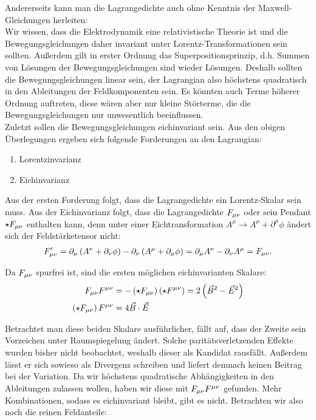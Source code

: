 Andererseits kann man die Lagrangedichte auch ohne Kenntnis der Maxwell-Gleichungen herleiten: \\
Wir wissen, dass die Elektrodynamik eine relativistische Theorie ist und die Bewegungsgleichungen daher invariant unter Lorentz-Transformationen sein sollten. Außerdem gilt in erster Ordnung das Superpositionsprinzip, d.h. Summen von Lösungen der Bewegungsgleichungen sind wieder Lösungen. Deshalb sollten die Bewegungsgleichungen linear sein, der Lagrangian also höchstens quadratisch in den Ableitungen der Feldkomponenten sein. Es könnten auch Terme höherer Ordnung auftreten, diese wären aber nur kleine Störterme, die die Bewegungsgleichungen nur unwesentlich beeinflussen. \\ 
Zuletzt sollen die Bewegungsgleichungen eichinvariant sein.
Aus den obigen Überlegungen ergeben sich folgende Forderungen an den Lagrangian: 
\begin{enumerate}
	\item Lorentzinvarianz
	\item Eichinvarianz 
\end{enumerate}

Aus der ersten Forderung folgt, dass die Lagrangedichte ein Lorentz-Skalar sein muss. Aus der Eichinvarianz folgt, dass die Lagrangedichte $F_{\mu \nu}$ oder sein Pendant $\star F_{\mu \nu}$ enthalten kann, denn unter einer Eichtransformation $A^{\mu} \rightarrow A^{\mu} + \partial^{\mu} \phi$ ändert sich der Feldstärketensor nicht:
\begin{align}
F_{\mu \nu} ' = \partial_{\mu} \left( A^{\nu} + \partial_{\nu} \phi \right) - \partial_{\nu} \left( A^{\mu} + \partial_{\mu} \phi \right) = \partial_{\mu}  A^{\nu} - \partial_{\nu} A^{\mu} = F_{\mu \nu}.
\end{align}

Da $F_{\mu \nu}$ spurfrei ist, sind die ersten möglichen eichinvarianten Skalare:
\begin{align}
F_{\mu \nu} F^{\mu \nu} &= - \left( \star F_{\mu \nu} \right) \left( \star F^{\mu \nu} \right) = 2 \left( \vec{B}^2 - \vec{E}^2 \right) \\
\left( \star F_{\mu \nu} \right) F^{\mu \nu} &= 4 \vec{B} \cdot \vec{E}
\end{align}

Betrachtet man diese beiden Skalare ausführlicher, fällt auf, dass der Zweite sein Vorzeichen unter Raumspiegelung ändert. Solche paritätsverletzenden Effekte wurden bisher nicht beobachtet, weshalb dieser als Kandidat rausfällt. Außerdem lässt er sich sowieso als Divergenz schreiben und liefert demnach keinen Beitrag bei der Variation. Da wir höchstens quadratische Abhängigkeiten in den Ableitungen zulassen wollen, haben wir diese mit $F_{\mu \nu} F^{\mu \nu}$ gefunden. Mehr Kombinationen, sodass es eichinvariant bleibt, gibt es nicht. Betrachten wir also noch die reinen Feldanteile: \\


